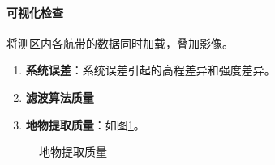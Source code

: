\paragraph{可视化检查}将测区内各航带的数据同时加载，叠加影像。
\begin{enumerate}
	\item \textbf{系统误差}：系统误差引起的高程差异和强度差异。
	\item \textbf{滤波算法质量}
	\item \textbf{地物提取质量}：如图\ref{fig:地物提取质量}。
\end{enumerate}
\begin{figure}[htbp]
	\centering
	\hspace{3em}
	\caption{地物提取质量}
	\label{fig:地物提取质量}
\end{figure}

